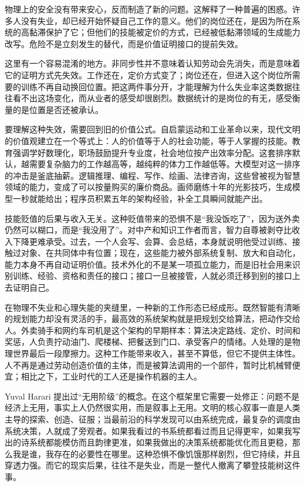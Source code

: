 
物理上的安全没有带来安心，反而制造了新的问题。这解释了一种普遍的困惑。许多人没有失业，却已经开始怀疑自己工作的意义。他们的岗位还在，是因为所在系统的高黏滞保护了它；但他们的技能被定价的方式，已经被低黏滞领域的生成能力改写。危险不是立刻发生的替代，而是价值证明接口的提前失效。

这里有一个容易混淆的地方。非同步性并不意味着认知劳动会先消失，而是意味着它的证明方式先失效。工作还在，定价方式变了；岗位还在，但进入这个岗位所需要的训练不再自动换回位置。把这两件事分开，才能理解为什么失业率这类数据往往看不出这场变化，而从业者的感受却很剧烈。数据统计的是岗位的有无，感受衡量的是位置是否还被承认。

要理解这种失效，需要回到旧的价值公式。自启蒙运动和工业革命以来，现代文明的价值观建立在一个等式上：人的价值等于人的社会功能，等于人掌握的技能。教育强调学好数理化，职场鼓励提升专业度，社会地位按产出效率分配。这套排序默认，越需要复杂脑力的工作越高等，越纯粹的体力工作越低等。大模型对这一排序的冲击是釜底抽薪。逻辑推理、编程、写作、绘画、法律咨询，这些曾被视为智慧领域的能力，变成了可以按量购买的廉价商品。画师磨练十年的光影技巧，生成模型一秒就能给出；程序员积累五年的架构经验，补全工具瞬间就能产出。

技能贬值的后果与收入无关。这种贬值带来的恐惧不是“我没饭吃了”，因为送外卖仍然可以糊口，而是“我没用了”。对中产和知识工作者而言，智力自尊被剥夺比收入下降更难承受。过去，一个人会写、会算、会总结，本身就说明他受过训练、接触过对象、在共同体中有位置；现在，这些能力被外部系统复制、放大和自动化，能力本身不再自动证明价值。技术外化的不是某一项孤立能力，而是旧社会用来识别训练、经验、资格和责任的接口；接口一旦被接管，人就必须迁移到别的接口上去证明自己。

在物理不失业和心理失能的夹缝里，一种新的工作形态已经成形。既然智能有清晰的规划能力却没有灵活的手，最高效的系统架构就是把规划交给算法，把动作交给人。外卖骑手和网约车司机是这个架构的早期样本：算法决定路线、定价、时间和奖惩，人负责拧动油门、爬楼梯、把餐送到门口、承受客户的情绪。人处理的是物理世界最后一段摩擦力。这种工作能带来收入，甚至不算低，但它不提供主体性。人不再是通过劳动创造价值的主体，而是被算法调用的一个部件，暂时比机械臂便宜；相比之下，工业时代的工人还是操作机器的主人。

Yuval Harari 提出过“无用阶级”的概念。在这个框架里它需要一处修正：问题不是经济上无用，事实上人仍然很实用，而是叙事上无用。文明的核心叙事一直是人类主导的探索、创造、征服；当最前沿的科学发现可以由系统完成，最复杂的调度由系统决策，人就成了旁观者。如果我看过的书系统都看过而且记得更牢，如果我写出的诗系统都能模仿而且韵律更准，如果我做出的决策系统都能优化而且更稳，那么我是谁，我存在的必要性在哪里。这种恐惧不像饥饿那样剧烈，但它持续，并且穿透力强。而它的现实后果，往往不是失业，而是一整代人撤离了攀登技能树这件事。

